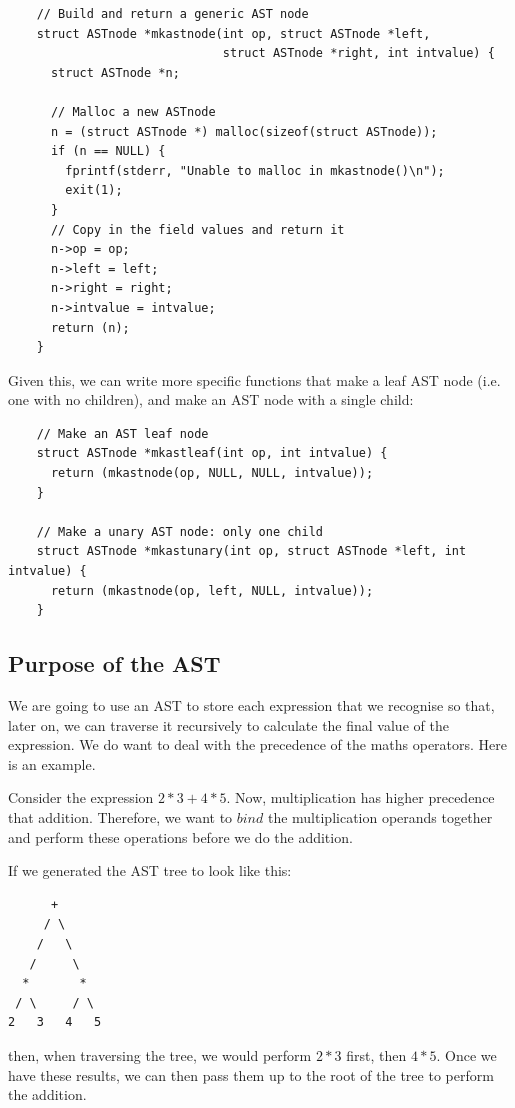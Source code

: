 \documentclass[journal, onecolumn, 12pt]{IEEEtran}
\begin{document}
\begin{lstlisting}
    // Build and return a generic AST node
    struct ASTnode *mkastnode(int op, struct ASTnode *left,
                              struct ASTnode *right, int intvalue) {
      struct ASTnode *n;

      // Malloc a new ASTnode
      n = (struct ASTnode *) malloc(sizeof(struct ASTnode));
      if (n == NULL) {
        fprintf(stderr, "Unable to malloc in mkastnode()\n");
        exit(1);
      }
      // Copy in the field values and return it
      n->op = op;
      n->left = left;
      n->right = right;
      n->intvalue = intvalue;
      return (n);
    }
\end{lstlisting}

Given this, we can write more specific functions that make a leaf AST node (i.e. one with no children), and make an AST node with a single child:

\begin{lstlisting}
    // Make an AST leaf node
    struct ASTnode *mkastleaf(int op, int intvalue) {
      return (mkastnode(op, NULL, NULL, intvalue));
    }

    // Make a unary AST node: only one child
    struct ASTnode *mkastunary(int op, struct ASTnode *left, int intvalue) {
      return (mkastnode(op, left, NULL, intvalue));
    }
\end{lstlisting}

\subsection{Purpose of the AST}

We are going to use an AST to store each expression that we recognise so that, later on, we can traverse it recursively to calculate the final value of the expression. We do want to deal with the precedence of the maths operators. Here is an example.

Consider the expression $2*3+4*5$. Now, multiplication has higher precedence that addition. Therefore, we want to $bind$ the multiplication operands together and perform these operations before we do the addition.

If we generated the AST tree to look like this:

\begin{lstlisting}
      +
     / \
    /   \
   /     \
  *       *
 / \     / \
2   3   4   5
\end{lstlisting}

then, when traversing the tree, we would perform $2*3$ first, then $4*5$. Once we have these results, we can then pass them up to the root of the tree to perform the addition.
\end{document}
